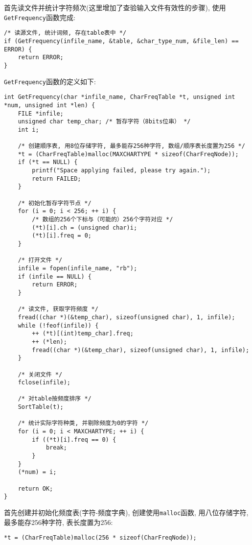 \documentclass[a4paper]{ctexart}
\begin{document}
首先读文件并统计字符频次(这里增加了查验输入文件有效性的步骤), 使用\texttt{GetFrequency}函数完成:

{\setmainfont{Courier New Bold}              
\begin{lstlisting}
/* 读源文件, 统计词频, 存在table表中 */
if (GetFrequency(infile_name, &table, &char_type_num, &file_len) == ERROR) {
    return ERROR;
}
\end{lstlisting}}

\texttt{GetFrequency}函数的定义如下:

{\setmainfont{Courier New Bold}              
\begin{lstlisting}
int GetFrequency(char *infile_name, CharFreqTable *t, unsigned int *num, unsigned int *len) {
    FILE *infile;
    unsigned char temp_char; /* 暂存字符（8bits位串） */
    int i;

    /* 创建顺序表, 用8位存储字符, 最多能存256种字符, 数组/顺序表长度置为256 */
    *t = (CharFreqTable)malloc(MAXCHARTYPE * sizeof(CharFreqNode));
    if (*t == NULL) {
        printf("Space applying failed, please try again.");
        return FAILED;
    }

    /* 初始化暂存字符节点 */
    for (i = 0; i < 256; ++ i) {
        /* 数组的256个下标与（可能的）256个字符对应 */
        (*t)[i].ch = (unsigned char)i;
        (*t)[i].freq = 0;
    }

    /* 打开文件 */
    infile = fopen(infile_name, "rb");
    if (infile == NULL) {
        return ERROR;
    }

    /* 读文件, 获取字符频度 */
    fread((char *)(&temp_char), sizeof(unsigned char), 1, infile);
    while (!feof(infile)) {
        ++ (*t)[(int)temp_char].freq;
        ++ (*len);
        fread((char *)(&temp_char), sizeof(unsigned char), 1, infile);
    }

    /* 关闭文件 */
    fclose(infile);

    /* 对table按频度排序 */
    SortTable(t);

    /* 统计实际字符种类, 并剔除频度为0的字符 */
    for (i = 0; i < MAXCHARTYPE; ++ i) {
        if ((*t)[i].freq == 0) {
            break;
        }
    }
    (*num) = i;

    return OK;
}
\end{lstlisting}}

首先创建并初始化频度表(字符-频度字典), 创建使用\texttt{malloc}函数, 用八位存储字符, 最多能存256种字符, 表长度置为256:

{\setmainfont{Courier New Bold}              
\begin{lstlisting}
*t = (CharFreqTable)malloc(256 * sizeof(CharFreqNode));
\end{lstlisting}}
\end{document}
